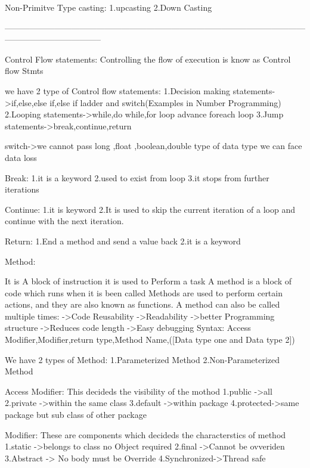 Non-Primitve Type casting:
      1.upcasting 
      2.Down Casting

-----------------------------------------------------------------------------------------------------------------------------------------------

Control Flow statements:
    Controlling the flow of execution is know as Control flow Stmts

we have 2 type of Control flow statements:
        1.Decision making statements->if,else,else if,else if ladder and switch(Examples in Number Programming)
        2.Looping statements->while,do while,for loop advance foreach loop
        3.Jump statements->break,continue,return

switch->we cannot pass long ,float ,boolean,double type of data type we can face data loss


Break:
   1.it is a keyword
   2.used to exist from loop
   3.it stops from further iterations

Continue:
   1.it is keyword
   2.It is used to skip the current iteration of a loop and continue with the next iteration.

Return:
  1.End a method and send a value back
  2.it is a keyword


  Method:

   It is A block of instruction it is used to Perform a task
   A method is a block of code which runs when it is been called
   Methods are used to perform certain actions, and they are also known as functions.
   A method can also be called multiple times:
      ->Code Reusability
      ->Readability
      ->better Programming structure
      ->Reduces code length
      ->Easy debugging
   Syntax:
   Access Modifier,Modifier,return type,Method Name,([Data type one and Data type 2])

  We have 2 types of Method:
      1.Parameterized Method
      2.Non-Parameterized Method
  


  Access Modifier:
         This decideds the visibility of the mothod
                    1.public ->all
                    2.private ->within the same class
                    3.default ->within package
                    4.protected->same package but sub class of other package
  
  Modifier:
         These are components which decideds the characterstics of method
         1.static ->belongs to class no Object required
         2.final ->Cannot be ovveriden
         3.Abstract -> No body must be Override
         4.Synchronized->Thread safe
   
